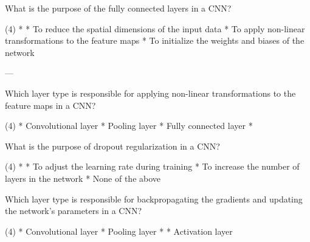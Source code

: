 \documentclass[10pt]{extarticle}
\begin{document}
\begin{exercise}
    What is the purpose of the fully connected layers in a CNN?
    \begin{choice} (4)
        * 
        * To reduce the spatial dimensions of the input data
        * To apply non-linear transformations to the feature maps
        * To initialize the weights and biases of the network
    \end{choice}
\end{exercise}
\begin{solution}
\end{solution}

---

\begin{exercise}
    Which layer type is responsible for applying non-linear transformations to the feature maps in a CNN?
    \begin{choice} (4)
        * Convolutional layer
        * Pooling layer
        * Fully connected layer
        * 
    \end{choice}
\end{exercise}
\begin{solution}
\end{solution}

\begin{exercise}
    What is the purpose of dropout regularization in a CNN?
    \begin{choice} (4)
        * 
        * To adjust the learning rate during training
        * To increase the number of layers in the network
        * None of the above
    \end{choice}
\end{exercise}
\begin{solution}
\end{solution}

\begin{exercise}
    Which layer type is responsible for backpropagating the gradients and updating the network's parameters in a CNN?
    \begin{choice} (4)
        * Convolutional layer
        * Pooling layer
        * 
        * Activation layer
    \end{choice}
\end{exercise}
\begin{solution}
\end{solution}
\end{document}
